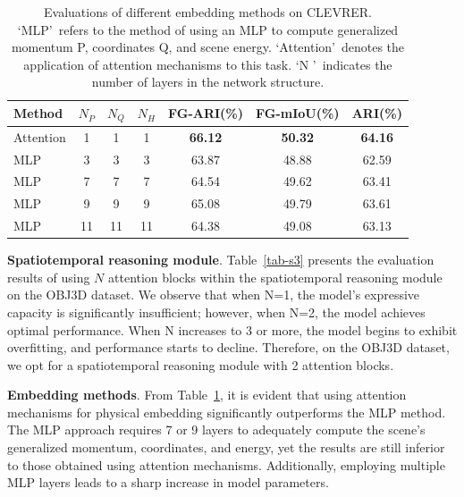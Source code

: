 \documentclass[sigconf]{acmart}
\begin{document}
\begin{table}[t!]
\caption{Evaluations of different embedding methods on CLEVRER. \textquoteleft MLP\textquoteright\ refers to the method of using an MLP to compute generalized momentum P, coordinates Q, and scene energy. \textquoteleft Attention\textquoteright\ denotes the application of attention mechanisms to this task. \textquoteleft N \textquoteright\ indicates the number of layers in the network structure. }
\label{tab-s4}
\vspace{-3pt}
\begin{tabular}{lcccccc}
\toprule
{\bf Method}&\small {\bf $N_P$}&\small {\bf $N_Q$}&\small {\bf $N_H$}&\small {\bf FG-ARI}\textsf{(\%)}&\small {\bf FG-mIoU}\textsf{(\%)}&\small {\bf ARI}\textsf{(\%)}\\
\midrule
Attention&1&1&1&\textbf{66.12}&\textbf{50.32}&\textbf{64.16}\\
MLP&3&3&3&63.87&48.88&62.59\\
MLP&7&7&7&64.54&49.62&63.41\\
MLP&9&9&9&65.08&49.79&63.61\\
MLP&11&11&11&64.38&49.08&63.13\\
\bottomrule
\end{tabular}
\vspace{0pt}
\end{table}

\textbf{Spatiotemporal reasoning module}. Table~\ref{tab-s3} presents the evaluation results of using $N$ attention blocks within the spatiotemporal reasoning module on the OBJ3D dataset. We observe that when N=1, the model's expressive capacity is significantly insufficient; however, when N=2, the model achieves optimal performance. When N increases to 3 or more, the model begins to exhibit overfitting, and performance starts to decline. Therefore, on the OBJ3D dataset, we opt for a spatiotemporal reasoning module with 2 attention blocks.

\vspace{3pt}

\textbf{Embedding methods}. From Table~\ref{tab-s4}, it is evident that using attention mechanisms for physical embedding significantly outperforms the MLP method. The MLP approach requires 7 or 9 layers to adequately compute the scene's generalized momentum, coordinates, and energy, yet the results are still inferior to those obtained using attention mechanisms. Additionally, employing multiple MLP layers leads to a sharp increase in model parameters.
\end{document}
